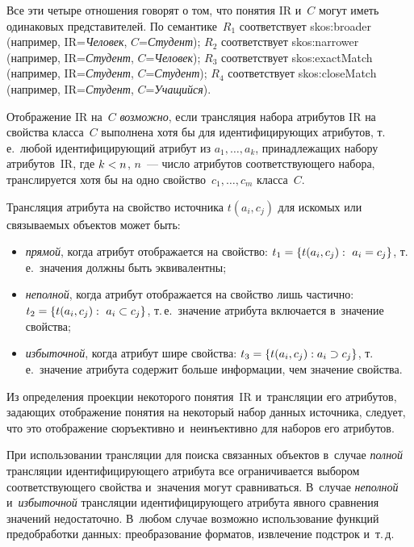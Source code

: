 \begin{multicols}{2}
    Все эти четыре отношения говорят о том, что понятия $\mathrm{IR}$ и~$C$ могут 
иметь одинаковых представителей. По семантике~$R_1$ соответствует 
skos:broader (например, $\mathrm{IR}$\;=\;\textit{Человек}, $C$\;=\;\textit{Студент}); 
$R_2$ соответствует skos:narrower (например, $\mathrm{IR}$\;=\;\textit{Студент}, 
$C$\;=\;\textit{Человек}); $R_3$ соответствует skos:exactMatch (например, 
$\mathrm{IR}$\;=\;\textit{Студент}, $C$\;=\;\textit{Студент}); $R_4$ соответствует 
skos:closeMatch (например, $\mathrm{IR}$\;=\;\textit{Студент}, 
$C$\;=\;\textit{Учащийся}).
    
    Отображение $\mathrm{IR}$ на~$C$ \textit{возможно}, если трансляция набора 
атрибутов $\mathrm{IR}$ на свойства класса~$C$ выполнена хотя бы для 
идентифицирующих атрибутов, т.\,е.\ любой идентифицирующий атрибут 
из $a_1, \ldots,  a_k$, принадлежащих набору атрибутов~$\mathrm{IR}$, где $k\hm< n$, 
$n$~--- число атрибутов соответствующего набора, транслируется хотя бы на 
одно свойство~$c_1, \ldots , c_m$ класса~$C$.
    
    Трансляция атрибута на свойство источника $t(a_i, c_j)$ для искомых 
или связываемых объектов может быть:
    \begin{itemize}
\item \textit{прямой}, когда атрибут отображается на свойство: 
$t_1\hm=\{t(a_i, c_j):\ a_i \hm= c_j\}$, т.\,е.\ значения должны быть 
эквивалентны;
\item \textit{неполной}, когда атрибут отображается на свойство лишь 
частично: $t_2\hm=\{t(a_i, c_j):\ a_i\subset c_j\}$, т.\,е.\ значение атрибута 
включается в~значение свойства;
\item \textit{избыточной}, когда атрибут шире свойства: $t_3\hm=\{t(a_i, 
c_j): a_i \supset c_j\}$, т.\,е.\ значение атрибута содержит больше 
информации, чем значение свойства.
\end{itemize}

    Из определения проекции некоторого понятия~$\mathrm{IR}$ и~трансляции его 
атрибутов, задающих отоб\-ра\-же\-ние понятия на некоторый набор данных 
источника, следует, что это отображение сюръективно и~неинъективно для 
наборов его атрибутов. 
    
    При использовании трансляции для поиска связанных объектов в~случае 
\textit{полной} трансляции идентифицирующего атрибута все ограничивается 
выбо\-ром соответствующего свойства и~значения могут сравниваться. 
В~случае \textit{неполной} и~\textit{избыточной} трансляции 
идентифицирующего атрибута явного сравнения значений недостаточно. 
В~любом случае возможно использование функций предобработки данных: 
преобразование форматов, извлечение подстрок и~т.\,д.
    

\end{multicols}
